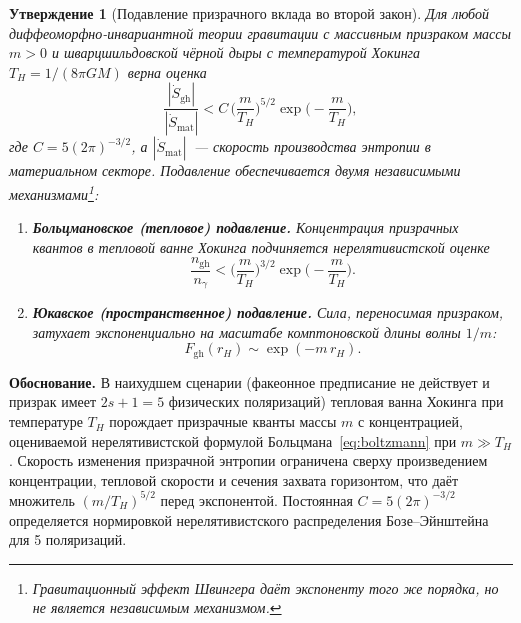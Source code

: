 \documentclass[12pt,a4paper]{article}
\newcommand{\Thr}{T_{\!H}}
\theoremstyle{plain}
\newtheorem{proposition}[theorem]{Утверждение}
\theoremstyle{definition}
\begin{document}
\begin{proposition}[Подавление призрачного вклада во второй закон]%
\label{prop:suppression}
Для любой диффеоморфно-инвариантной теории гравитации с
массивным призраком массы $m > 0$ и шварцшильдовской чёрной дыры
с температурой Хокинга $\Thr = 1/(8\pi G M)$ верна оценка
\begin{equation}\label{eq:main_bound}
  \frac{|\dot S_{\mathrm{gh}}|}{|\dot S_{\mathrm{mat}}|}
  < C\,\biggl(\frac{m}{\Thr}\biggr)^{\!5/2}
  \exp\!\biggl(-\frac{m}{\Thr}\biggr),
\end{equation}
где $C = 5(2\pi)^{-3/2}$,
а $|\dot S_{\mathrm{mat}}|$~--- скорость производства энтропии
в материальном секторе.
Подавление обеспечивается двумя независимыми
механизмами\footnote{Гравитационный эффект Швингера даёт экспоненту
того же порядка, но не является независимым механизмом.}:
\begin{enumerate}
  \item[\textup{I.}] \textbf{Больцмановское (тепловое) подавление.}
    Концентрация призрачных квантов в тепловой ванне Хокинга подчиняется
    нерелятивистской оценке
    \begin{equation}\label{eq:boltzmann}
      \frac{n_{\mathrm{gh}}}{n_\gamma}
      < \biggl(\frac{m}{\Thr}\biggr)^{\!3/2}
      \exp\!\biggl(-\frac{m}{\Thr}\biggr).
    \end{equation}

  \item[\textup{II.}] \textbf{Юкавское (пространственное) подавление.}
    Сила, переносимая призраком, затухает экспоненциально на масштабе
    комптоновской длины волны $1/m$:
    \begin{equation}\label{eq:yukawa}
      F_{\mathrm{gh}}(r_H) \sim \exp(-m\, r_H).
    \end{equation}
\end{enumerate}
\end{proposition}

\textbf{Обоснование.}
В наихудшем сценарии (факеонное предписание не действует и призрак
имеет $2s+1 = 5$ физических поляризаций) тепловая ванна Хокинга
при температуре $\Thr$ порождает призрачные кванты массы $m$
с концентрацией, оцениваемой нерелятивистской формулой
Больцмана~\eqref{eq:boltzmann} при $m \gg \Thr$.
Скорость изменения призрачной энтропии ограничена сверху
произведением концентрации, тепловой скорости и сечения захвата
горизонтом, что даёт множитель $(m/\Thr)^{5/2}$ перед экспонентой.
Постоянная $C = 5(2\pi)^{-3/2}$ определяется нормировкой
нерелятивистского распределения Бозе--Эйнштейна для 5 поляризаций.
\end{document}
